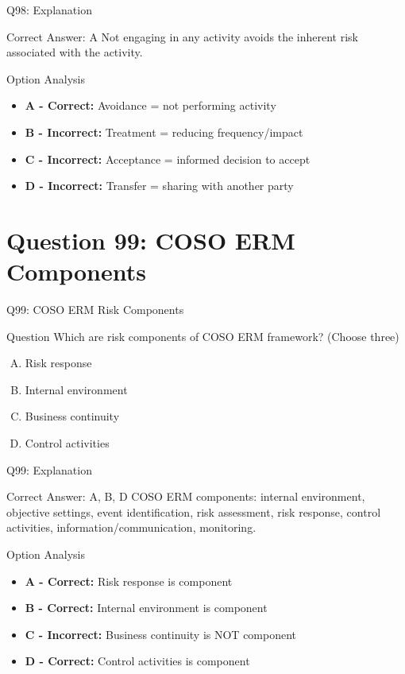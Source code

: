 \documentclass{beamer}
\begin{document}
	\begin{frame}{Q98: Explanation}
		\begin{block}{Correct Answer: A}
			Not engaging in any activity avoids the inherent risk associated with the activity.
		\end{block}
		\begin{block}{Option Analysis}
			\begin{itemize}
				\item \textbf{A - Correct:} Avoidance = not performing activity
				\item \textbf{B - Incorrect:} Treatment = reducing frequency/impact
				\item \textbf{C - Incorrect:} Acceptance = informed decision to accept
				\item \textbf{D - Incorrect:} Transfer = sharing with another party
			\end{itemize}
		\end{block}
	\end{frame}
	
	\section{Question 99: COSO ERM Components}
	
	\begin{frame}{Q99: COSO ERM Risk Components}
		\begin{block}{Question}
			Which are risk components of COSO ERM framework? (Choose three)
		\end{block}
		\begin{enumerate}[(A)]
			\item Risk response
			\item Internal environment
			\item Business continuity
			\item Control activities
		\end{enumerate}
	\end{frame}
	
	\begin{frame}{Q99: Explanation}
		\begin{block}{Correct Answer: A, B, D}
			COSO ERM components: internal environment, objective settings, event identification, risk assessment, risk response, control activities, information/communication, monitoring.
		\end{block}
		\begin{block}{Option Analysis}
			\begin{itemize}
				\item \textbf{A - Correct:} Risk response is component
				\item \textbf{B - Correct:} Internal environment is component
				\item \textbf{C - Incorrect:} Business continuity is NOT component
				\item \textbf{D - Correct:} Control activities is component
			\end{itemize}
		\end{block}
	\end{frame}
	
\end{document}
